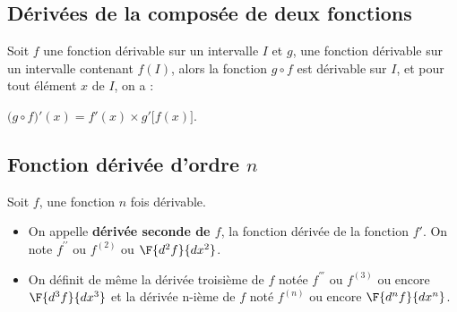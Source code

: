 \subsection{Dérivées de la composée de deux fonctions}
\begin{propriete}
Soit $f$ une fonction dérivable sur un intervalle $I$ et $g$, une fonction dérivable sur un intervalle contenant $f(I)$, alors la fonction $g\circ f$ est dérivable sur $I$, et pour tout élément $x$ de $I$, on a : 
\par $\big(g\circ f\big)'(x)=f'(x)\times g'\big[f(x)\big]$.
\end{propriete}
\subsection{Fonction dérivée d'ordre $n$}
\begin{definition}[s]
Soit $f$, une fonction $n$ fois dérivable. 
\begin{itemize}
\item On appelle \textbf{dérivée seconde de $f$}, la fonction dérivée de la fonction $f'$. On note $f^{\prime\prime}$ ou $f^{(2)}$ ou $\F{d^2f}{dx^2}$.
\item On définit de même la dérivée troisième de $f$ notée $f^{'''}$ ou $f^{(3)}$ ou encore $\F{d^3f}{dx^3}$ et la dérivée n-ième de $f$ noté $f^{(n)}$ ou encore $\F{d^nf}{dx^n}$.
\end{itemize}
\end{definition}
